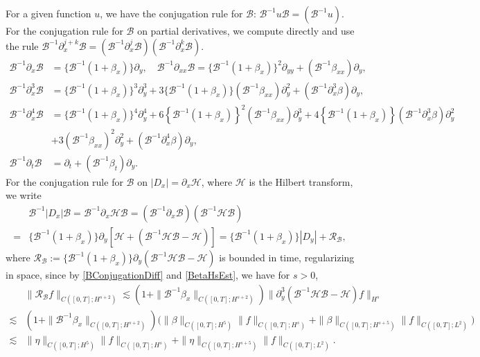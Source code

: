 \documentclass[12pt]{amsart}
\theoremstyle{remark}
\theoremstyle{definition}
\numberwithin{equation}{section}
\newcommand{\p}{\partial}
\newcommand{\mB}{\mathcal{B}}
\newcommand{\mH}{\mathcal{H}}
\newcommand{\mR}{\mathcal{R}}
\renewcommand{\b}{\beta}
\newcommand{\inv}{^{-1}}
\begin{document}
For a given function $u$, we have the conjugation rule for $\mB$: $\mB^{-1} u \mB = (\mB^{-1} u)$. 
For the conjugation rule for $\mB$ on partial derivatives, we compute directly and use the rule $\mB\inv \p_x^{j+k} \mB = (\mB\inv \p_x^{j} \mB) (\mB\inv \p_x^{k} \mB)$.
\begin{align*}
\mB\inv \p_x \mB & = \{ \mB\inv(1 + \b_x) \} \p_y, \quad  
\mB\inv \p_{xx} \mB  = \{ \mB\inv(1 + \b_x) \}^2 \p_{yy} + (\mB\inv \b_{xx}) \p_y, 
\\
\mB\inv \p_{x}^3 \mB & = \{ \mB\inv(1 + \b_x) \}^3 \p_{y}^3 +3\{\mB\inv(1 + \b_x)\}(\mB\inv \b_{xx} )\p_{y}^2+(\mB\inv \p^3_x\b)\p_{y},
\\
\mB\inv \p_{x}^4 \mB & = \{ \mB\inv(1 + \b_x) \}^4 \p_{y}^4 +6\left\{\mB\inv(1 + \b_x)\right\}^2 (\mB\inv \b_{xx} )\p_{y}^3+4\left\{\mB\inv(1 + \b_x)\right\}(\mB\inv \p^3_x\b)\p^2_y\\
&+3(\mB\inv \b_{xx} )^2\p^2_y+(\mB\inv \p^4_x\b )\p_y,
\\
\mB\inv \p_t \mB & = \p_t + (\mB\inv \b_t) \p_y. 
\end{align*}
For the conjugation rule for $\mB$ on $|D_x| = \p_x \mH$, where $\mH$ is the Hilbert transform, we write
\begin{align*}
&\mB\inv |D_x| \mB 
= \mB\inv \p_x \mH \mB 
= (\mB\inv \p_x \mB) (\mB\inv \mH \mB)\\
=& \{ \mB\inv(1 + \b_x) \} \p_y [ \mH + (\mB\inv \mH \mB - \mH) ] = \{ \mB\inv(1 + \b_x) \} |D_y| + \mR_{\mB},   
\end{align*}
where $\mR_{\mB} := \{ \mB\inv(1 + \b_x) \} \p_y (\mB\inv \mH \mB - \mH)$ is bounded in time, regularizing in space, since by \eqref{BConjugationDiff} and \eqref{BetaHsEst}, we have for $s >0$,
\begin{align*}
 &\|\mR_{\mB} f \|_{C([0,T];H^{s+2})} \lesssim \left(1+\|\mB\inv \b_x  \|_{C([0,T];H^{s+2})}\right) \|\p_y^3 (\mB\inv \mH \mB - \mH) f \|_{H^s}\\
 \lesssim& \left(1+\|\mB\inv \b_x  \|_{C([0,T];H^{s+2})}\right)\bigl( \|\beta\|_{C([0,T];H^{5})} \|f\|_{C([0,T];H^s)} + \|\beta\|_{C([0,T];H^{s+5})} \|f\|_{C([0,T];L^2)} \bigr)\\
 \lesssim&  \|\eta\|_{C([0,T];H^{5})} \|f\|_{C([0,T];H^s)} + \|\eta\|_{C([0,T];H^{s+5})} \|f\|_{C([0,T];L^2)}.
\end{align*}
\end{document}

